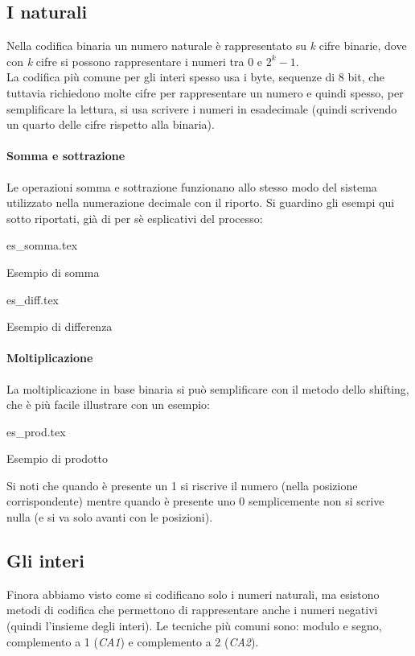 \documentclass[class=book, crop=false, oneside]{standalone}
\begin{document}
\subsection{I naturali} Nella codifica binaria un numero naturale è rappresentato su \emph{k} cifre binarie, dove con \emph{k} cifre si possono rappresentare i numeri tra 0 e $2^{k}-1$.\\
La codifica più comune per gli interi spesso usa i byte, sequenze di 8 bit, che tuttavia richiedono molte cifre per rappresentare un numero e quindi spesso, per semplificare la lettura, si usa scrivere i numeri in esadecimale (quindi scrivendo un quarto delle cifre rispetto alla binaria).

\paragraph*{Somma e sottrazione}
Le operazioni somma e sottrazione funzionano allo stesso modo del sistema utilizzato nella numerazione decimale con il riporto. Si guardino gli esempi qui sotto riportati, già di per sè esplicativi del processo:\\

\begin{table}[H]
	\centering
	{es_somma.tex}
	\caption{Esempio di somma}
\end{table}

\begin{table}[H]
	\centering
	{es_diff.tex}
	\caption{Esempio di differenza}
\end{table}

\paragraph*{Moltiplicazione} La moltiplicazione in base binaria si può semplificare con il metodo dello shifting, che è più facile illustrare con un esempio:
\begin{table}[H]
	\centering
	{es_prod.tex}
	\caption{Esempio di prodotto}
\end{table}
Si noti che quando è presente un 1 si riscrive il numero (nella posizione corrispondente) mentre  quando è presente uno 0 semplicemente non si scrive nulla (e si va solo avanti con le posizioni).

\subsection{Gli interi} Finora abbiamo visto come si codificano solo i numeri naturali, ma esistono metodi di codifica che permettono di rappresentare anche i numeri negativi (quindi l’insieme degli interi). Le tecniche più comuni sono: modulo e segno, complemento a 1 (\emph{CA1}) e complemento a 2 (\emph{CA2}).
\end{document}
